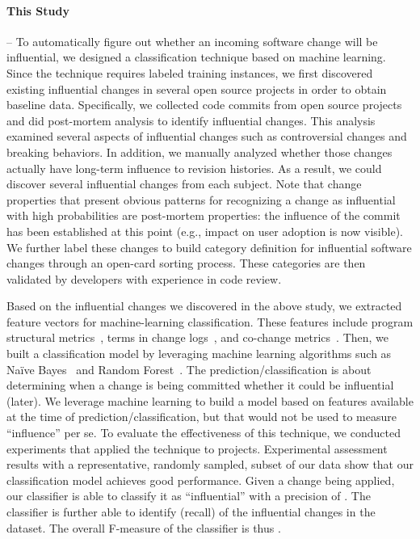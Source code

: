 \paragraph*{\bf This Study} -- To automatically figure out whether an incoming software change will be influential, we
designed a classification technique based on machine learning. Since
the technique requires labeled training instances, we first discovered existing
influential changes in several open source projects in order to obtain baseline
data. Specifically, we collected \numChanges code commits from \numSubjects open source projects and did
post-mortem analysis to identify influential changes. This analysis examined
several aspects of influential changes such as controversial changes and breaking
behaviors. In addition, we manually analyzed whether those changes actually have
long-term influence to revision histories.
As a result, we could discover several influential changes from each subject. Note that change properties that present obvious patterns for recognizing a change as influential with high probabilities are post-mortem properties: the influence of the commit has been established at this point (e.g., impact on user adoption is now visible).
We further label these changes to build category definition for influential software changes
through an open-card sorting process. These categories are then validated by
developers with experience in code review.   



Based on the influential changes we discovered in the above study, we extracted
feature vectors for machine-learning classification. These features include program structural
metrics~\cite{kim_classifying_2008}, terms in change
logs~\cite{kim_classifying_2008}, and co-change metrics~\cite{Beyer05}.
Then, we built a classification model by leveraging machine learning algorithms such as
Na\"{i}ve Bayes~\cite{lewis:ecml:1998,mlbook} and Random
Forest~\cite{breiman_random_2001}. The prediction/classification is about determining when a change is being committed whether it could be influential (later). We leverage machine learning to build a model based on features available at the time of prediction/classification, but that would not be used to measure ``influence'' per se. 
To evaluate the effectiveness of this technique, we conducted experiments that
applied the technique to \numSubjects projects.
Experimental assessment results with a representative, randomly sampled, subset of our data show that 
our classification model achieves good performance. Given a change being applied, our classifier is able
to classify it as ``influential'' with a precision of 
\precisionwild. The classifier is further able to identify \recallwild (recall) of the influential changes 
in the dataset. The overall F-measure of the classifier is thus \fmeasurewild.

